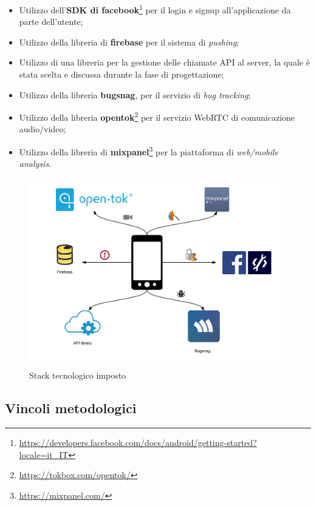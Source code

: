 \begin{itemize}

\item Utilizzo dell'\textbf{SDK di facebook}\footnote{\url{https://developers.facebook.com/docs/android/getting-started?locale=it_IT}} per il login e signup all'applicazione da parte dell'utente;
\item Utilizzo della libreria di \textbf{firebase} per il sistema di \textit{pushing};
\item Utilizzo di una libreria per la gestione delle chiamate API al server, la quale è stata scelta e discussa durante la fase di progettazione;
\item Utilizzo della libreria \textbf{bugsnag}, per il servizio di \textit{bug tracking};
\item Utilizzo della libreria \textbf{opentok}\footnote{\url{https://tokbox.com/opentok/}} per il servizio WebRTC di comunicazione audio/video;
\item Utilizzo della libreria di \textbf{mixpanel}\footnote{\url{https://mixpanel.com/}} per la piattaforma di \textit{web/mobile analysis}.

\end{itemize} 

\begin{figure}[htpd]
\centering
\includegraphics[width=\textwidth]{../immagini/vincoli-tec}
\caption{Stack tecnologico imposto} 
\end{figure}

\subsection{Vincoli metodologici}

